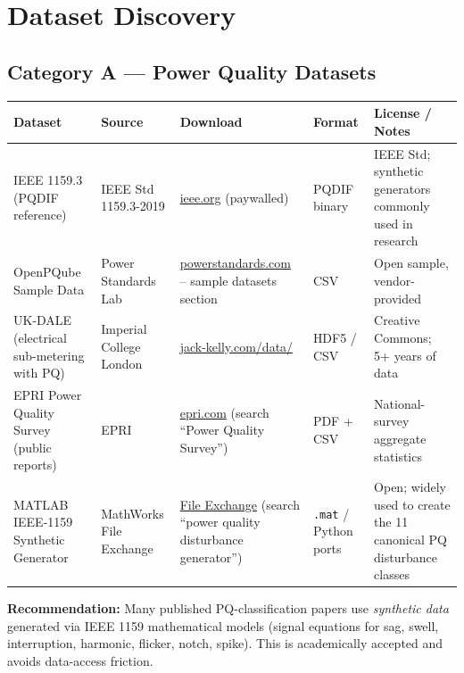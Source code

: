 \documentclass[11pt,a4paper]{article}
\begin{document}
\section{Dataset Discovery}
\label{sec:datasets}

\subsection{Category A --- Power Quality Datasets}

\begin{longtable}{p{3.0cm}p{3.0cm}p{4.2cm}p{2.0cm}p{3.5cm}}
\toprule
\textbf{Dataset} & \textbf{Source} & \textbf{Download} & \textbf{Format} & \textbf{License / Notes} \\
\midrule
\endhead

IEEE 1159.3 (PQDIF reference) & IEEE Std 1159.3-2019 &
\href{https://standards.ieee.org/ieee/1159.3/3819/}{ieee.org} (paywalled) &
PQDIF binary & IEEE Std; synthetic generators commonly used in research \\

OpenPQube Sample Data & Power Standards Lab &
\href{https://www.powerstandards.com/products/pqube/}{powerstandards.com} --
sample datasets section &
CSV & Open sample, vendor-provided \\

UK-DALE (electrical sub-metering with PQ) & Imperial College London &
\href{https://jack-kelly.com/data/}{jack-kelly.com/data/} &
HDF5 / CSV & Creative Commons; 5+ years of data \\

EPRI Power Quality Survey (public reports) & EPRI &
\href{https://www.epri.com/}{epri.com} (search ``Power Quality Survey'') &
PDF + CSV & National-survey aggregate statistics \\

MATLAB IEEE-1159 Synthetic Generator & MathWorks File Exchange &
\href{https://www.mathworks.com/matlabcentral/fileexchange/}{File Exchange} (search ``power quality disturbance generator'') &
\texttt{.mat} / Python ports & Open; widely used to create the 11 canonical
PQ disturbance classes \\
\bottomrule
\end{longtable}

\noindent\textbf{Recommendation:} Many published PQ-classification papers
use \emph{synthetic data} generated via IEEE 1159 mathematical models
(signal equations for sag, swell, interruption, harmonic, flicker, notch,
spike). This is academically accepted and avoids data-access friction.
\end{document}
